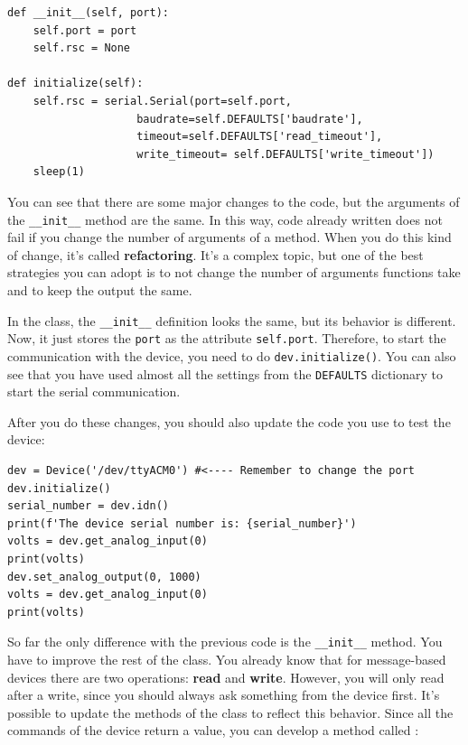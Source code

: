 \begin{verbatim}
def __init__(self, port):
    self.port = port
    self.rsc = None

def initialize(self):
    self.rsc = serial.Serial(port=self.port,
                    baudrate=self.DEFAULTS['baudrate'],
                    timeout=self.DEFAULTS['read_timeout'],
                    write_timeout= self.DEFAULTS['write_timeout'])
    sleep(1)
\end{verbatim}

You can see that there are some major changes to the code, but the arguments of the \texttt{__init__} method are the same. In this way, code already written does not fail if you change the number of arguments of a method. When you do this kind of change, it's called \textbf{refactoring}. It's a complex topic, but one of the best strategies you can adopt is to not change the number of arguments functions take and to keep the output the same.

In the class, the \texttt{__init__} definition looks the same, but its behavior is different. Now, it just stores the \texttt{port} as the attribute \texttt{self.port}. Therefore, to start the communication with the device, you need to do \texttt{dev.initialize()}. You can also see that you have used almost all the settings from the \texttt{DEFAULTS} dictionary to start the serial communication.

After you do these changes, you should also update the code you use to test the device:

\begin{verbatim}
dev = Device('/dev/ttyACM0') #<---- Remember to change the port
dev.initialize()
serial_number = dev.idn()
print(f'The device serial number is: {serial_number}')
volts = dev.get_analog_input(0)
print(volts)
dev.set_analog_output(0, 1000)
volts = dev.get_analog_input(0)
print(volts)
\end{verbatim}

\sloppy So far the only difference with the previous code is the \texttt{__init__} method. You have to improve the rest of the class. You already know that for message-based devices there are two operations: \textbf{read} and \textbf{write}. However, you will only read after a write, since you should always ask something from the device first. It's possible to update the methods of the class to reflect this behavior. Since all the commands of the device return a value, you can develop a method called :

